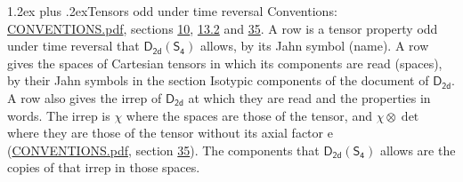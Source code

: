 \documentclass[10pt,a4paper]{article}
\makeatletter
\renewcommand\section{\@startsection{section}{1}{\z@}{-3ex plus -1ex minus -.2ex}%
  {1.2ex plus .2ex}{\normalfont\large\sffamily\bfseries\color{parttitle}}}
\numberwithin{equation}{section}
\newcommand{\grp}[1]{\mathsf{#1}}
\newcommand{\irrprod}{\otimes}
\makeatother
\begin{document}
\section{Tensors odd under time reversal}\label{s:time_odd}
Conventions: \href{../../CONVENTIONS.pdf}{CONVENTIONS.pdf}, sections \href{../../../rotation/CONVENTIONS.pdf\#conv.10}{10}, \href{../../../rotation/CONVENTIONS.pdf\#conv.13.2}{13.2} and \href{../../CONVENTIONS.pdf\#conv.35}{35}.
\leavevmode\label{n:head.name.property}A row is a tensor property odd under time reversal that $\grp{D_{2d}}(\grp{S_{4}})$ allows, by its Jahn symbol (name). \label{n:head.spaces}A row gives the spaces of Cartesian tensors in which its components are read (spaces), by their Jahn symbols in the section Isotypic components of the document of \href{../../../rotation/data/pdf/D2d.pdf}{$\grp{D_{2d}}$}. \label{n:head.properties}A row also gives the irrep of $\grp{D_{2d}}$ at which they are read and the properties in words. The irrep is $\chi$ where the spaces are those of the tensor, and $\chi \irrprod \det$ where they are those of the tensor without its axial factor e (\href{../../CONVENTIONS.pdf}{CONVENTIONS.pdf}, section \href{../../CONVENTIONS.pdf\#conv.35}{35}). The components that $\grp{D_{2d}}(\grp{S_{4}})$ allows are the copies of that irrep in those spaces.
\end{document}
